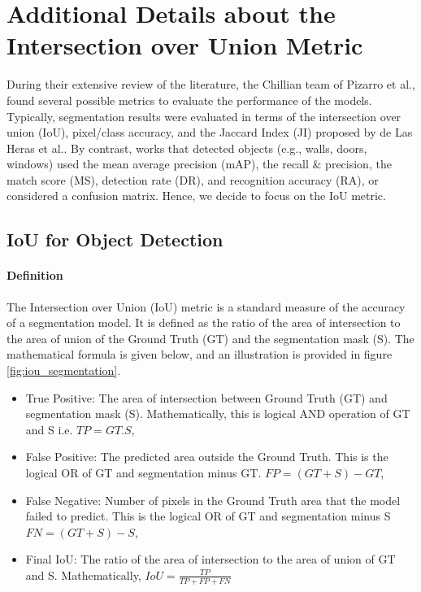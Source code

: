 \documentclass[11pt]{article}
\begin{document}

\section{Additional Details about the Intersection over Union Metric}
\label{app:sec:IoUdetails}
During their extensive review of the literature, the Chillian team of
Pizarro et al.\cite{PIZARRO2022104348}, 
found several possible
metrics to evaluate the performance of the models. 
Typically, segmentation results were evaluated in terms
of the intersection over union (IoU), pixel/class accuracy, and
the Jaccard Index (JI) proposed by de Las Heras et al.. By contrast, works that 
detected objects (e.g., walls, doors, windows) used
the mean average precision (mAP), the recall \& precision, the match
score (MS), detection rate (DR), and recognition accuracy (RA),
or considered a confusion matrix.
Hence, we decide to focus on the IoU metric.

\subsection{IoU for Object Detection}
\paragraph{Definition} The Intersection over Union (IoU) metric is a standard
measure of the accuracy of a segmentation model. It is defined as the ratio of
the area of intersection to the area of union of the Ground Truth (GT) and the 
segmentation mask (S). The mathematical formula is given below, and an illustration
is provided in figure \ref{fig:iou_segmentation}.

\begin{itemize}
    \item True Positive: The area of intersection between Ground Truth (GT) and segmentation mask (S). Mathematically, this is logical AND operation of GT and S i.e.
    $TP = GT.S$,
    \item False Positive: The predicted area outside the Ground Truth. This is the logical OR of GT and segmentation minus GT.
    $FP=(GT+S) - GT$,
    \item False Negative: Number of pixels in the Ground Truth area that the model failed to predict. This is the logical OR of GT and segmentation minus S
    $FN=(GT+S) -S$,
    \item Final IoU: The ratio of the area of intersection to the area of union of GT and S. Mathematically,
    $IoU = \frac{TP}{TP+FP+FN}$
\end{itemize}
\end{document}

